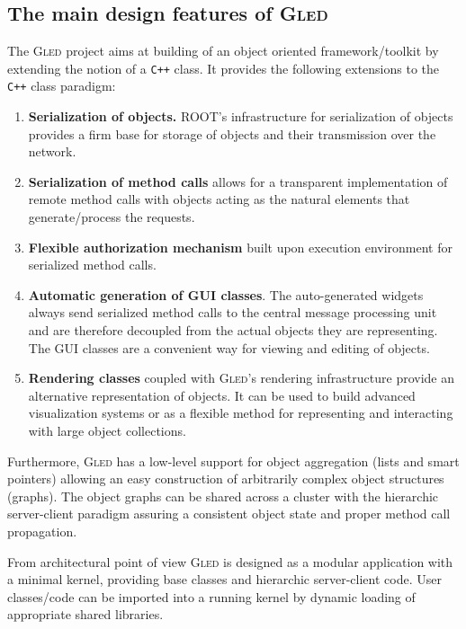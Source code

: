 \documentclass[a4paper,11pt]{article}
\def\gled{\textsc{Gled}\xspace}
\def\smalltt#1{{\small\texttt{#1}}}
\begin{document}
\subsection{The main design features of \gled}

The \gled project aims at building of an object oriented
framework/toolkit by extending the notion of a \smalltt{C++} class. It
provides the following extensions to the \smalltt{C++} class paradigm:

\begin{enumerate}
\item \textbf{Serialization of objects.} ROOT's infrastructure for
  serialization of objects provides a firm base for storage of objects
  and their transmission over the network.
\item \textbf{Serialization of method calls} allows for a transparent
  implementation of remote method calls with objects acting as the
  natural elements that generate/process the requests.
\item \textbf{Flexible authorization mechanism} built upon execution
  environment for serialized method calls. 
\item \textbf{Automatic generation of GUI classes}. The auto-generated
  widgets always send serialized method calls to the central message
  processing unit and are therefore decoupled from the actual objects
  they are representing. The GUI classes are a convenient way for
  viewing and editing of objects.
\item \textbf{Rendering classes} coupled with \gled's rendering
  infrastructure provide an alternative representation of objects. It
  can be used to build advanced visualization systems or as a
  flexible method for representing and interacting with large object
  collections.
\end{enumerate}

Furthermore, \gled has a low-level support for object aggregation (lists
and smart pointers) allowing an easy construction of arbitrarily
complex object structures (graphs). The object graphs can be shared across a
cluster with the hierarchic server-client paradigm assuring a consistent
object state and proper method call propagation.

From architectural point of view \gled is designed as a modular
application with a minimal kernel, providing base classes and
hierarchic server-client code. User classes/code can be imported into
a running kernel by dynamic loading of appropriate shared libraries.
\end{document}
